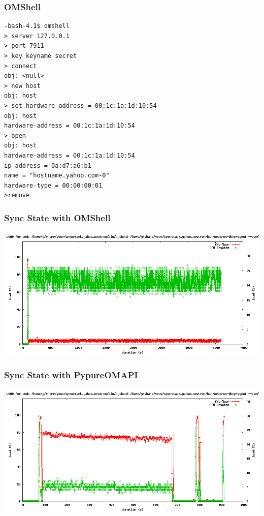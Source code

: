 \documentclass[aspectratio=169,11pt,hyperref={colorlinks=true}]{beamer}
\newcommand\Fontvi{\fontsize{6}{7.2}\selectfont}
\begin{document}
\begin{frame}[fragile]
    \frametitle{OMShell}
    \Fontvi
\begin{verbatim}
-bash-4.1$ omshell
> server 127.0.0.1
> port 7911
> key keyname secret
> connect
obj: <null>
> new host
obj: host
> set hardware-address = 00:1c:1a:1d:10:54  
obj: host
hardware-address = 00:1c:1a:1d:10:54
> open
obj: host
hardware-address = 00:1c:1a:1d:10:54
ip-address = 0a:d7:a6:b1
name = "hostname.yahoo.com-0"
hardware-type = 00:00:00:01
>remove
    \end{verbatim}
\end{frame}

\begin{frame}
    \frametitle{Sync State with OMShell}
     \begin{center}
         \includegraphics[scale=0.35]{logos/omshell.png}
    \end{center}
\end{frame}


\begin{frame}
    \frametitle{Sync State with PypureOMAPI}
     \begin{center}
         \includegraphics[scale=0.35]{logos/pypureomapi.png}
    \end{center}
\end{frame}
\end{document}
